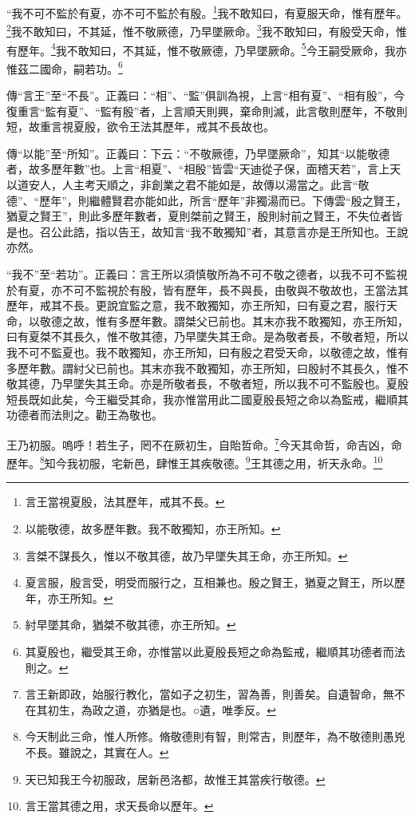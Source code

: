 “我不可不監於有夏，亦不可不監於有殷。\footnote{言王當視夏殷，法其歷年，戒其不長。}我不敢知曰，有夏服天命，惟有歷年。\footnote{以能敬德，故多歷年數。我不敢獨知，亦王所知。}我不敢知曰，不其延，惟不敬厥德，乃早墜厥命。\footnote{言桀不謀長久，惟以不敬其德，故乃早墜失其王命，亦王所知。}我不敢知曰，有殷受天命，惟有歷年。\footnote{夏言服，殷言受，明受而服行之，互相兼也。殷之賢王，猶夏之賢王，所以歷年，亦王所知。}我不敢知曰，不其延，惟不敬厥德，乃早墜厥命。\footnote{紂早墜其命，猶桀不敬其德，亦王所知。}今王嗣受厥命，我亦惟茲二國命，嗣若功。\footnote{其夏殷也，繼受其王命，亦惟當以此夏殷長短之命為監戒，繼順其功德者而法則之。}


{\noindent\zhuan{}\fzbyks 傳“言王”至“不長”。正義曰：“相”、“監”俱訓為視，上言“相有夏”、“相有殷”，今復重言“監有夏”、“監有殷”者，上言順天則興，棄命則滅，此言敬則歷年，不敬則短，故重言視夏殷，欲令王法其歷年，戒其不長故也。 \par}

{\noindent\zhuan{}\fzbyks 傳“以能”至“所知”。正義曰：下云：“不敬厥德，乃早墜厥命”，知其“以能敬德者，故多歷年數”也。上言“相夏”、“相殷”皆雲“天迪從子保，面稽天若”，言上天以道安人，人主考天順之，非創業之君不能如是，故傳以湯當之。此言“敬德”、“歷年”，則繼體賢君亦能如此，所言“歷年”非獨湯而已。下傳雲“殷之賢王，猶夏之賢王”，則此多歷年數者，夏則桀前之賢王，殷則紂前之賢王，不失位者皆是也。召公此誥，指以告王，故知言“我不敢獨知”者，其意言亦是王所知也。王說亦然。 \par}

{\noindent\shu{}\fzkt “我不”至“若功”。正義曰：言王所以須慎敬所為不可不敬之德者，以我不可不監視於有夏，亦不可不監視於有殷，皆有歷年，長不與長，由敬與不敬故也，王當法其歷年，戒其不長。更說宜監之意，我不敢獨知，亦王所知，曰有夏之君，服行天命，以敬德之故，惟有多歷年數。謂桀父已前也。其末亦我不敢獨知，亦王所知，曰有夏桀不其長久，惟不敬其德，乃早墜失其王命。是為敬者長，不敬者短，所以我不可不監夏也。我不敢獨知，亦王所知，曰有殷之君受天命，以敬德之故，惟有多歷年數。謂紂父已前也。其末亦我不敢獨知，亦王所知，曰殷紂不其長久，惟不敬其德，乃早墜失其王命。亦是所敬者長，不敬者短，所以我不可不監殷也。夏殷短長既如此矣，今王繼受其命，我亦惟當用此二國夏殷長短之命以為監戒，繼順其功德者而法則之。勸王為敬也。 \par}

王乃初服。嗚呼！若生子，罔不在厥初生，自貽哲命。\footnote{言王新即政，始服行教化，當如子之初生，習為善，則善矣。自遺智命，無不在其初生，為政之道，亦猶是也。○遺，唯季反。}今天其命哲，命吉凶，命歷年。\footnote{今天制此三命，惟人所修。脩敬德則有智，則常吉，則歷年，為不敬德則愚兇不長。雖說之，其實在人。}知今我初服，宅新邑，肆惟王其疾敬德。\footnote{天已知我王今初服政，居新邑洛都，故惟王其當疾行敬德。}王其德之用，祈天永命。\footnote{言王當其德之用，求天長命以歷年。}


